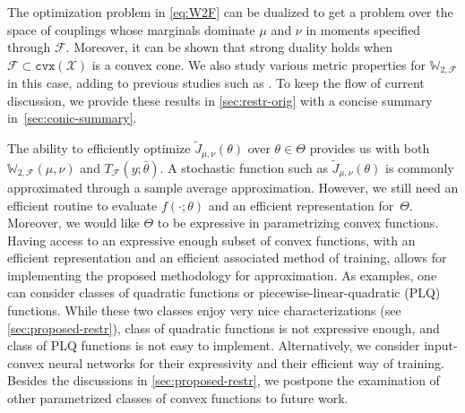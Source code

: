 \documentclass[10pt]{article}
\renewcommand{\tilde}{\widetilde}
\newcommand{\cvx}{\mathtt{cvx}}
\newcommand{\W}{\mathds{W}}
\newcommand{\calF}{\mathcal{F}}
\newcommand{\calX}{\mathcal{X}}
\numberwithin{equation}{section}
\begin{document}
\begin{remark}
The optimization problem in \eqref{eq:W2F} can be dualized to get a problem over the space of couplings whose marginals dominate $\mu$ and $\nu$ in moments specified through $\calF$. Moreover, it can be shown that strong duality holds when $\calF\subset \cvx(\calX)$ is a convex cone. We also study various metric properties for $\W_{2,\calF}$ in this case, adding to previous studies such as \cite{farnia2018convex}. 
To keep the flow of current discussion, we provide these results in \autoref{sec:restr-orig} with a concise summary in~\autoref{sec:conic-summary}.
\end{remark}
The ability to efficiently optimize $\tilde{J}_{\mu,\nu}(\theta)$ over $\theta\in\Theta$ provides us with both $\W_{2,\calF} (\mu,\nu)$ and $T_{\calF}(y;\bar{\theta}) $. A stochastic function such as $\tilde{J}_{\mu,\nu}(\theta)$ is commonly approximated through a sample average approximation. However, we still need an efficient routine to evaluate $f(\cdot; \theta)$ and an efficient representation for~$\Theta$. Moreover, we would like $\Theta$ to be expressive in parametrizing convex functions. 
Having access to an expressive enough subset of convex functions, with an efficient representation and an efficient associated method of training, allows for implementing the proposed methodology for approximation. 
%
As examples, one can consider classes of quadratic functions or piecewise-linear-quadratic (PLQ) functions. While these two classes enjoy very nice characterizations (see \autoref{sec:proposed-restr}), class of quadratic functions is not expressive enough, and class of PLQ functions is not easy to implement. Alternatively, we consider input-convex neural networks \citep{amos2016input} for their expressivity and their efficient way of training. Besides the discussions in \autoref{sec:proposed-restr}, we postpone the examination of other parametrized classes of convex functions \citep{helton2010semidefinite,aravkin2013sparse,ahmadi2014dsos,jalali2017variational} to future work. 
\end{document}
